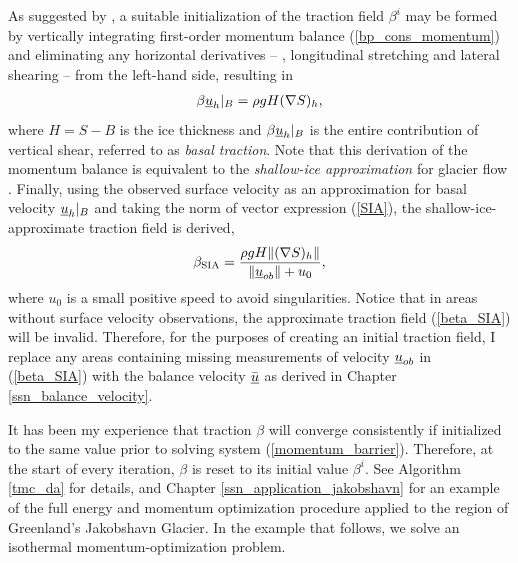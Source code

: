 As suggested by \citet{morlighem_2013}, a suitable initialization of the traction field $\beta^i$ may be formed by vertically integrating first-order momentum balance (\ref{bp_cons_momentum}) and eliminating any horizontal derivatives -- \ie, longitudinal stretching and lateral shearing -- from the left-hand side, resulting in
\begin{align}
  \label{SIA}
  \beta \underline{u}_h |_B = \rho g H (\nabla S)_h,
\end{align}
where $H = S - B$ is the ice thickness and $\beta \underline{u}_h |_B$ is the entire contribution of vertical shear, referred to as \emph{basal traction}.  Note that this derivation of the momentum balance is equivalent to the  \emph{shallow-ice approximation} for glacier flow \citep{greve_2009}.  Finally, using the observed surface velocity as an approximation for basal velocity $\underline{u}_h |_B$ and taking the norm of vector expression (\ref{SIA}), the shallow-ice-approximate traction field is derived,
\begin{align}
  \label{beta_SIA}
  \beta_{\text{SIA}} = \frac{\rho g H \Vert (\nabla S)_h \Vert}{\Vert \underline{u}_{ob} \Vert+ u_0},
\end{align}
where $u_0$ is a small positive speed to avoid singularities.  Notice that in areas without surface velocity observations, the approximate traction field (\ref{beta_SIA}) will be invalid.  Therefore, for the purposes of creating an initial traction field, I replace any areas containing missing measurements of velocity $\underline{u}_{ob}$ in (\ref{beta_SIA}) with the balance velocity $\bar{\underline{u}}$ as derived in Chapter \ref{ssn_balance_velocity}.

It has been my experience that traction $\beta$ will converge consistently if initialized to the same value prior to solving system (\ref{momentum_barrier}).  Therefore, at the start of every iteration, $\beta$ is reset to its initial value $\beta^i$.  See Algorithm \ref{tmc_da} for details, and Chapter \ref{ssn_application_jakobshavn} for an example of the full energy and momentum optimization procedure applied to the region of Greenland's Jakobshavn Glacier.  In the example that follows, we solve an isothermal momentum-optimization problem.

